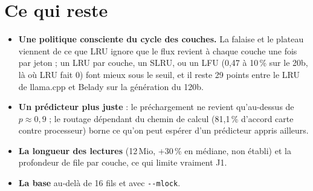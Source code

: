 \section{Ce qui reste}\label{sec:t2o-reste}

\begin{itemize}
\item \textbf{Une politique consciente du cycle des couches.} La falaise et le plateau viennent de ce que LRU ignore que le flux revient à chaque couche une fois par jeton ; un LRU par couche, un SLRU, ou un LFU (0,47 à 10\,\% sur le 20b, là où LRU fait 0) font mieux sous le seuil, et il reste 29 points entre le LRU de llama.cpp et Belady sur la génération du 120b.
\item \textbf{Un prédicteur plus juste} : le préchargement ne revient qu'au-dessus de $p \approx 0{,}9$ ; le routage dépendant du chemin de calcul (81,1\,\% d'accord carte contre processeur) borne ce qu'on peut espérer d'un prédicteur appris ailleurs.
\item \textbf{La longueur des lectures} (12\,Mio, +30\,\% en médiane, non établi) et la profondeur de file par couche, ce qui limite vraiment J1.
\item \textbf{La base} au-delà de 16 fils et avec \texttt{-{}-mlock}.
\end{itemize}

